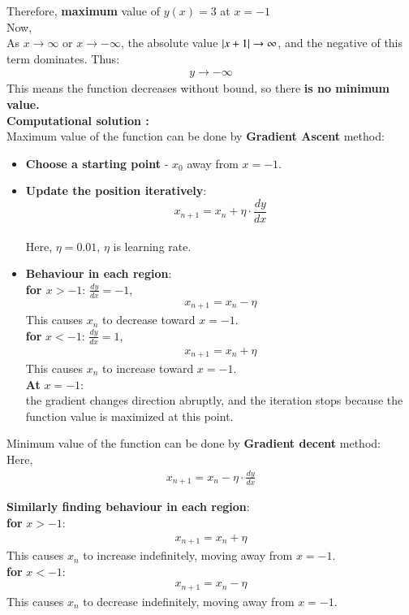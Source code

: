 \documentclass[journal]{IEEEtran}
\begin{document}
Therefore, \textbf{maximum} value of $y(x) = 3$  at $x = -1$ \\


Now,\\
As $x \rightarrow \infty$ or $x \rightarrow -\infty$, the absolute value $\left\vert x+1\right\vert \rightarrow \infty$, and the negative of this term dominates. Thus:
\begin{align}
    y \rightarrow -\infty
\end{align}
This means the function decreases without bound, so there \textbf{is no minimum value.}\\


\textbf{Computational solution :}\\
Maximum value of the function can be done by \textbf{Gradient Ascent} method:
\begin{itemize}
    \item \textbf{Choose a starting point} - $x_0$ away from $x = -1$.
    \item \textbf{Update the position iteratively}:
    $$x_{n+1} = x_{n} + \eta \cdot \frac{dy}{dx}$$\\
    Here, $\eta = 0.01$, $\eta$ is learning rate.
    \item \textbf{Behaviour in each region}:\\
    \textbf{for $x > -1$}:   $\frac{dy}{dx} = -1$,
    \begin{align}
        x_{n+1} = x_{n} - \eta
    \end{align}
    This causes $x_n$ to decrease toward $x = -1$.\\
    \textbf{for} $x < -1$: $\frac{dy}{dx} = 1$,
    \begin{align}
        x_{n+1} = x_{n} + \eta
    \end{align}
    This causes $x_n$ to increase toward $x = -1$.\\
\textbf{At} $x = -1$:  \\
the gradient changes direction abruptly, and the iteration stops because the function value is maximized at this point.
\end{itemize}
Minimum value of the function can be done by \textbf{Gradient decent} method:\\

Here,
\begin{align}
    x_{n+1} = x_{n} - \eta \cdot \frac{dy}{dx}
\end{align}

\textbf{Similarly finding behaviour in each region}:\\
\textbf{for} $x>-1$: \\
\begin{align}
    x_{n+1} = x_{n} + \eta
\end{align}
This causes $x_n$ to increase indefinitely, moving away from $x = -1$.\\
\textbf{for} $x<-1$: \\
\begin{align}
    x_{n+1} = x_{n} - \eta
\end{align}
This causes $x_n$ to decrease indefinitely, moving away from $x = -1$.\\ 
\end{document}
